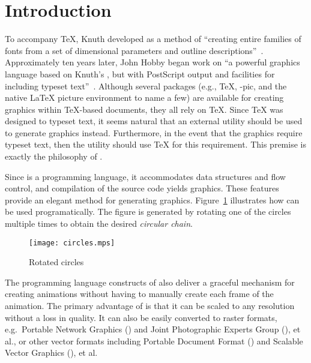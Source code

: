 \section{Introduction}
\label{sec:introduction}

\addtocounter{footnote}{1}%
To accompany \TeX{}, Knuth developed \MF{} as a method of ``creating
entire families of fonts from a set of dimensional parameters and
outline descriptions''~\cite{beebe:mf}.  Approximately ten years later,
John Hobby began work on \MP{}\Dash ``a powerful graphics language based
on Knuth's \MF, but with PostScript output and facilities for including
typeset text''~\cite{hobby:user}.  Although several packages (e.g.,
\PiC\TeX, \Xy-pic, and the native \LaTeX{} picture environment to name a
few) are available for creating graphics within \TeX-based documents,
they all rely on \TeX{}.  Since \TeX{} was designed to typeset text, it
seems natural that an external utility should be used to generate
graphics instead.  Furthermore, in the event that the graphics require
typeset text, then the utility should use \TeX{} for this requirement.
This premise is exactly the philosophy of \MP.

Since \MP{} is a programming language, it accommodates data structures
and flow control, and compilation of the \MP{} source code yields \EPS{}
graphics.  These features provide an elegant method for generating
graphics.  Figure~\ref{fig:circles} illustrates how \MP{} can be used
programatically.  The figure is generated by rotating one of the circles
multiple times to obtain the desired \textit{circular chain}.

\begin{figure}
  \centering
  \texttt{[image: circles.mps]}
  \caption{Rotated circles}
  \label{fig:circles}
\end{figure}

The programming language constructs of \MP{} also deliver a graceful
mechanism for creating animations without having to manually create each
frame of the animation.  The primary advantage of \EPS{} is that it can
be scaled to any resolution without a loss in quality.  It can also be
easily converted to raster formats, e.g.\ Portable Network Graphics
(\PNG) and Joint Photographic Experts Group (\JPEG), et al., or other
vector formats including Portable Document Format (\PDF) and Scalable
Vector Graphics (\SVG), et al.
